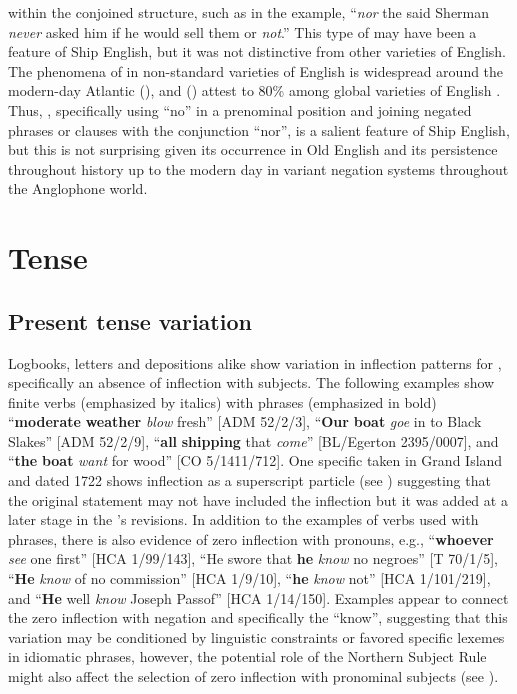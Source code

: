  within the conjoined structure, such as in the example, “\textit{nor} the said Sherman \textit{never} asked him if he would sell them or \textit{not}.” This type of  may have been a feature of Ship English, but it was not distinctive from other varieties of English. The phenomena of  in non-standard varieties of English is widespread  around the modern-day Atlantic (\citealt{vanderAuwera2016}), and (\citealt{KortmannLunkenheimer2013}) attest to  80\%  among global varieties of English . Thus, , specifically using “no” in a prenominal position and joining negated phrases or clauses with the conjunction “nor”, is a salient feature of Ship English, but this is not surprising given its occurrence in Old English and its persistence throughout history up to the modern day in variant negation systems throughout the Anglophone world.  

\section{{Tense}}\label{sec:6.2}

\subsection{{Present tense variation} }\label{sec:6.2.1}

Logbooks, letters and depositions alike show variation in inflection patterns for  , specifically an absence of inflection with  subjects. The following examples show  finite verbs (emphasized by italics) with   phrases (emphasized in bold) “\textbf{moderate} \textbf{weather} \textit{blow} fresh” [ADM 52/2/3], “\textbf{Our} \textbf{boat} \textit{goe} in to Black Slakes” [ADM 52/2/9], “\textbf{all} \textbf{shipping} that \textit{come}” [BL/Egerton 2395/0007], and “\textbf{the} \textbf{boat} \textit{want} for wood” [CO 5/1411/712]. One specific  taken in Grand  Island and dated 1722 shows inflection as a superscript particle (see ) suggesting that the original statement may not have included the inflection but it was added at a later stage in the ’s revisions. In addition to the examples of verbs used with   phrases, there is also evidence of zero inflection with  pronouns, e.g., “\textbf{whoever} \textit{see} one first” [HCA 1/99/143], “He swore that \textbf{he} \textit{know} no negroes” [T 70/1/5], “\textbf{He} \textit{know} of no commission” [HCA 1/9/10], “\textbf{he} \textit{know} not” [HCA 1/101/219], and “\textbf{He} well \textit{know} Joseph Passof” [HCA 1/14/150]. Examples appear to connect the zero inflection with negation and specifically the  “know”, suggesting that this variation may be conditioned by linguistic constraints or favored specific lexemes in idiomatic phrases, however, the potential role of the Northern Subject Rule might also affect the selection of zero inflection with  pronominal subjects (see  \citealt{deHaas2008}). 

